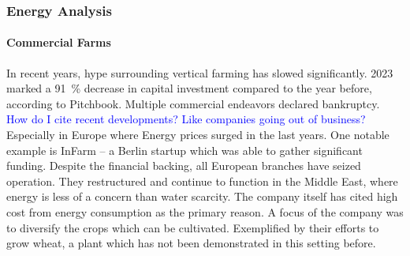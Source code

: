 
\subsubsection{Energy Analysis}
\label{subsub:energy-analysis}




\paragraph{Commercial Farms}
\label{par:prop-ener-commercialfarms}
In recent years, hype surrounding vertical farming has slowed significantly.
2023 marked a \SI{91}{\percent} decrease in capital investment compared to the year before, according to Pitchbook.
Multiple commercial endeavors declared bankruptcy.
\textcolor{Blue}{How do I cite recent developments? Like companies going out of business?}
Especially in Europe where Energy prices surged in the last years.
One notable example is InFarm -- a Berlin startup which was able to gather significant funding.
Despite the financial backing, all European branches have seized operation.
They restructured and continue to function in the Middle East, where energy is less of a concern than water scarcity.
The company itself has cited high cost from energy consumption as the primary reason.
A focus of the company was to diversify the crops which can be cultivated.
Exemplified by their efforts to grow wheat, a plant which has not been demonstrated in this setting before.

